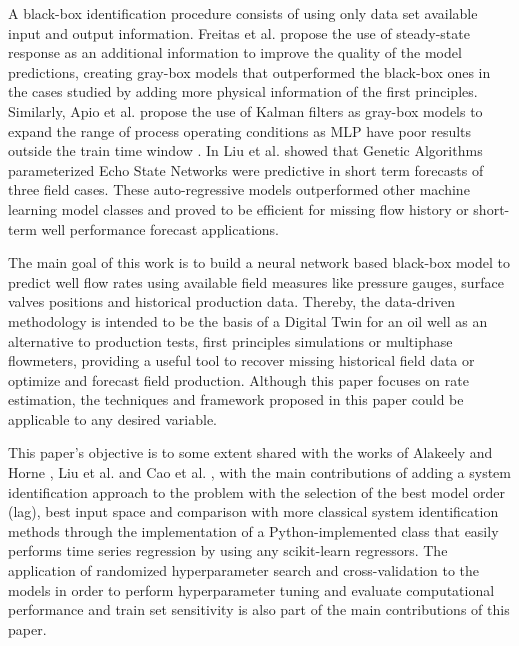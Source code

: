 \documentclass[conference]{IEEEtran}
\begin{document}
A black-box identification procedure consists of using only data set available input and output information. Freitas et al. \cite{Freitas2021} propose the use of steady-state response as an additional information to improve the quality of the model predictions, creating gray-box models that outperformed the black-box ones in the cases studied by adding more physical information of the first principles. Similarly, Apio et al. \cite{Apio2019} propose the use of Kalman filters as gray-box models to expand the range of process operating conditions as MLP have poor results outside the train time window \cite{Apio2019}. In \cite{Liu2022} Liu et al. showed that Genetic Algorithms parameterized Echo State Networks were predictive in short term forecasts of three field cases. These auto-regressive models outperformed other machine learning model classes and proved to be efficient for missing flow history or short-term well performance forecast applications.

The main goal of this work is to build a neural network based black-box model to predict well flow rates using available field measures like pressure gauges, surface valves positions and historical production data. Thereby, the data-driven methodology is intended to be the basis of a Digital Twin for an oil well as an alternative to production tests, first principles simulations or multiphase flowmeters, providing a useful tool to recover missing historical field data or optimize and forecast field production. Although this paper focuses on rate estimation, the techniques and framework proposed in this paper could be applicable to any desired variable.

This paper's objective is to some extent shared with the works of Alakeely and Horne \cite{Alakeely2021}, Liu et al. \cite{Liu2022} and Cao et al. \cite{CaoQ2016}, with the main contributions of adding a system identification approach to the problem with the selection of the best model order (lag), best input space and comparison with more classical system identification methods through the implementation of a Python-implemented class that easily performs time series regression by using any scikit-learn regressors. The application of randomized hyperparameter search and cross-validation to the models in order to perform hyperparameter tuning and evaluate computational performance and train set sensitivity is also part of the main contributions of this paper.

\end{document}
